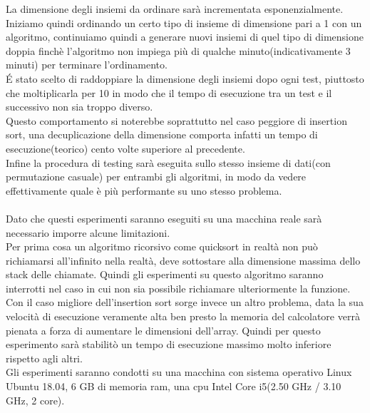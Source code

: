\documentclass[]{article}
\begin{document}
La dimensione degli insiemi da ordinare sarà incrementata esponenzialmente.\\
Iniziamo quindi ordinando un certo tipo di insieme di dimensione pari a 1 con un algoritmo, continuiamo quindi a generare nuovi insiemi di quel tipo di dimensione doppia finchè l'algoritmo non impiega più di qualche minuto(indicativamente 3 minuti) per terminare l'ordinamento.\\
\'E stato scelto di raddoppiare la dimensione degli insiemi dopo ogni test, piuttosto che moltiplicarla per 10 in modo che il tempo di esecuzione tra un test e il successivo non sia troppo diverso.\\
Questo comportamento si noterebbe soprattutto nel caso peggiore di insertion sort, una decuplicazione della dimensione comporta infatti un tempo di esecuzione(teorico) cento volte superiore al precedente.\\
Infine la procedura di testing sarà eseguita sullo stesso insieme di dati(con permutazione casuale) per entrambi gli algoritmi, in modo da vedere effettivamente quale è più performante su uno stesso problema.\\\\
Dato che questi esperimenti saranno eseguiti su una macchina reale sarà necessario imporre alcune limitazioni.\\
Per prima cosa un algoritmo ricorsivo come quicksort in realtà non può richiamarsi all'infinito nella realtà, deve sottostare alla dimensione massima dello stack delle chiamate. Quindi gli esperimenti su questo algoritmo saranno interrotti nel caso in cui non sia possibile richiamare ulteriormente la funzione.\\
Con il caso migliore dell'insertion sort sorge invece un altro problema, data la sua velocità di esecuzione veramente alta ben presto la memoria del calcolatore verrà pienata a forza di aumentare le dimensioni dell'array. Quindi per questo esperimento sarà stabilitò un tempo di esecuzione massimo molto inferiore rispetto agli altri.\\
Gli esperimenti saranno condotti su una macchina con sistema operativo Linux Ubuntu 18.04, 6 GB di memoria ram, una cpu Intel Core i5(2.50 GHz / 3.10 GHz, 2 core).
\end{document}
